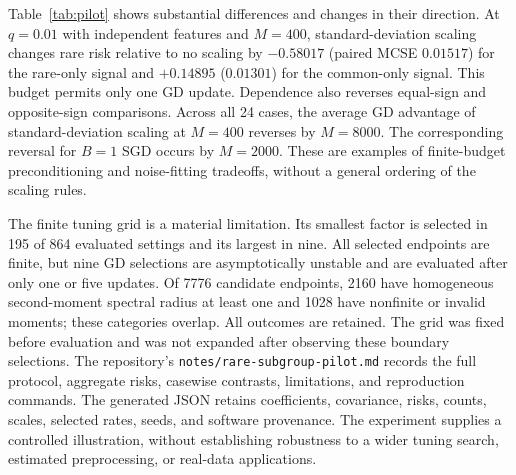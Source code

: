 Table~\ref{tab:pilot} shows substantial differences and changes in their
direction. At $q = 0.01$ with independent features and $M = 400$,
standard-deviation scaling changes rare risk relative to no scaling by
$-0.58017$ (paired MCSE $0.01517$) for the rare-only signal and $+0.14895$
($0.01301$) for the common-only signal. This budget permits only one GD update.
Dependence also reverses equal-sign and opposite-sign comparisons. Across all 24
cases, the average GD advantage of standard-deviation scaling at $M = 400$
reverses by $M = 8000$. The corresponding reversal for $B = 1$ SGD occurs by
$M = 2000$. These are examples of finite-budget preconditioning and
noise-fitting tradeoffs, without a general ordering of the scaling rules.

The finite tuning grid is a material limitation. Its smallest factor is selected
in 195 of 864 evaluated settings and its largest in nine. All selected endpoints
are finite, but nine GD selections are asymptotically unstable and are evaluated
after only one or five updates. Of 7776 candidate endpoints, 2160 have
homogeneous second-moment spectral radius at least one and 1028 have nonfinite
or invalid moments; these categories overlap. All outcomes are retained. The
grid was fixed before evaluation and was not expanded after observing these
boundary selections. The repository's \texttt{notes/rare-subgroup-pilot.md}
records the full protocol, aggregate risks, casewise contrasts, limitations, and
reproduction commands. The generated JSON retains coefficients, covariance,
risks, counts, scales, selected rates, seeds, and software provenance. The
experiment supplies a controlled illustration, without establishing robustness
to a wider tuning search, estimated preprocessing, or real-data applications.
